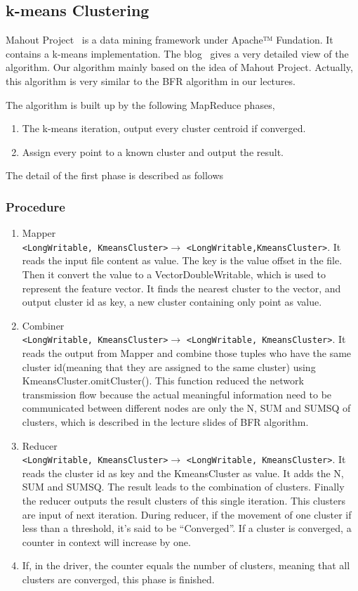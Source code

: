 \documentclass[a4paper,11pt]{article}
\begin{document}
\subsection{k-means Clustering}
Mahout Project~\cite{apache:mahout} is a data mining framework under Apache™
Fundation. It contains a k-means implementation. The blog~\cite{algo:kmeans3}
gives a very detailed view of the algorithm. Our algorithm mainly based on the
idea of Mahout Project. Actually, this algorithm is very similar to the BFR
algorithm in our lectures.

The algorithm is built up by the following MapReduce phases,
\begin{enumerate}
  \item The k-means iteration, output every cluster centroid if
  converged.  	
  \item Assign every point to a known cluster and output the result.
\end{enumerate}

The detail of the first phase is described as follows
\subsubsection{Procedure}
\begin{enumerate}
  \item Mapper\\\verb|<LongWritable, KmeansCluster>|$\rightarrow$
  \verb|<LongWritable,KmeansCluster>|. It reads the input file content as value.
  The key is the value offset in the file. Then it convert the value to a
  VectorDoubleWritable, which is used to represent the feature vector. It finds
  the nearest cluster to the vector, and output cluster id as key, a new cluster
  containing only point as value.
  \item Combiner\\\verb|<LongWritable, KmeansCluster>|$\rightarrow$
  \verb|<LongWritable, KmeansCluster>|. It reads the output from Mapper and
  combine those tuples who have the same cluster id(meaning that they are
  assigned to the same cluster) using KmeansCluster.omitCluster(). This function
  reduced the network transmission flow because the actual meaningful
  information need to be communicated between different nodes are only the N,
  SUM and SUMSQ of clusters, which is described in the lecture slides of BFR 
  algorithm. 
  \item Reducer\\\verb|<LongWritable, KmeansCluster>|$\rightarrow$
  \verb|<LongWritable, KmeansCluster>|. It reads the cluster id as key and the
  KmeansCluster as value. It adds the N, SUM and SUMSQ. The result leads to the
  combination of clusters. Finally the reducer outputs the result clusters of
  this single iteration. This clusters are input of next iteration. During
  reducer, if the movement of one cluster if less than a threshold, it's said
  to be ``Converged''. If a cluster is converged, a counter in context will
  increase by one.
  \item If, in the driver, the counter equals the number of clusters, meaning
  that all clusters are converged, this phase is finished.
\end{enumerate} 
\end{document}
